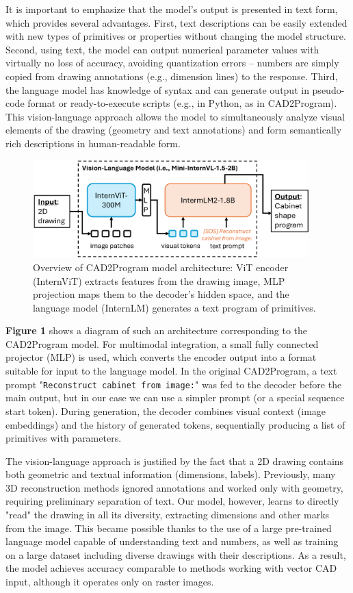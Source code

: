 \documentclass{article}
\begin{document}
It is important to emphasize that the model's output is presented in text form, which provides several advantages. First, text descriptions can be easily extended with new types of primitives or properties without changing the model structure. Second, using text, the model can output numerical parameter values with virtually no loss of accuracy, avoiding quantization errors – numbers are simply copied from drawing annotations (e.g., dimension lines) to the response. Third, the language model has knowledge of syntax and can generate output in pseudo-code format or ready-to-execute scripts (e.g., in Python, as in CAD2Program). This vision-language approach allows the model to simultaneously analyze visual elements of the drawing (geometry and text annotations) and form semantically rich descriptions in human-readable form.

\begin{figure}[h!]
\centering
\includegraphics[width=0.95\textwidth]{internvl.png}
\caption{Overview of CAD2Program model architecture: ViT encoder (InternViT) extracts features from the drawing image, MLP projection maps them to the decoder's hidden space, and the language model (InternLM) generates a text program of primitives.}
\end{figure}

\textbf{Figure 1} shows a diagram of such an architecture corresponding to the CAD2Program model. For multimodal integration, a small fully connected projector (MLP) is used, which converts the encoder output into a format suitable for input to the language model. In the original CAD2Program, a text prompt "\texttt{Reconstruct cabinet from image:}" was fed to the decoder before the main output, but in our case we can use a simpler prompt (or a special sequence start token). During generation, the decoder combines visual context (image embeddings) and the history of generated tokens, sequentially producing a list of primitives with parameters.

The vision-language approach is justified by the fact that a 2D drawing contains both geometric and textual information (dimensions, labels). Previously, many 3D reconstruction methods ignored annotations and worked only with geometry, requiring preliminary separation of text. Our model, however, learns to directly "read" the drawing in all its diversity, extracting dimensions and other marks from the image. This became possible thanks to the use of a large pre-trained language model capable of understanding text and numbers, as well as training on a large dataset including diverse drawings with their descriptions. As a result, the model achieves accuracy comparable to methods working with vector CAD input, although it operates only on raster images.
\end{document}
